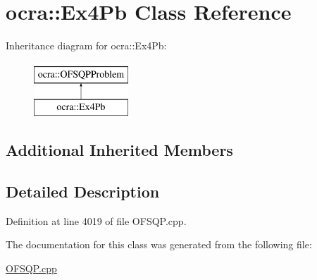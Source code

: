 \hypertarget{classocra_1_1Ex4Pb}{}\section{ocra\+:\+:Ex4\+Pb Class Reference}
\label{classocra_1_1Ex4Pb}
Inheritance diagram for ocra\+:\+:Ex4\+Pb\+:\begin{figure}[H]
\begin{center}
\leavevmode
\includegraphics[height=2.000000cm]{d5/dbb/classocra_1_1Ex4Pb}
\end{center}
\end{figure}
\subsection*{Additional Inherited Members}


\subsection{Detailed Description}


Definition at line 4019 of file O\+F\+S\+Q\+P.\+cpp.



The documentation for this class was generated from the following file\+:\begin{DoxyCompactItemize}
\item 
\hyperlink{OFSQP_8cpp}{O\+F\+S\+Q\+P.\+cpp}\end{DoxyCompactItemize}
